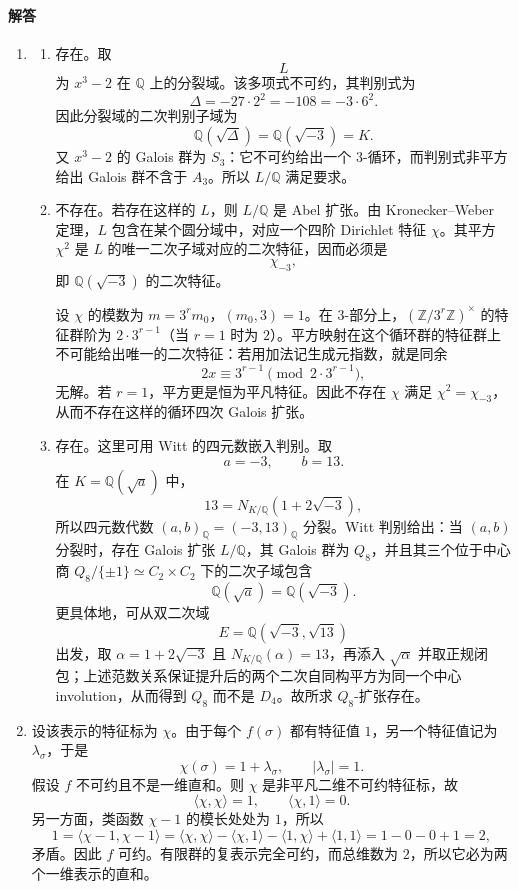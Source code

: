 \documentclass[UTF8,12pt]{ctexart}
\begin{document}
\paragraph{解答}
\begin{enumerate}[label=\textbf{\arabic*.},leftmargin=2.2em]
\item
\begin{enumerate}[label=\textbf{(\alph*)},leftmargin=2.4em]
\item 存在。取
\[
L
\]
为 \(x^3-2\) 在 \(\mathbb Q\) 上的分裂域。该多项式不可约，其判别式为
\[
\Delta=-27\cdot 2^2=-108=-3\cdot6^2.
\]
因此分裂域的二次判别子域为
\[
\mathbb Q(\sqrt{\Delta})=\mathbb Q(\sqrt{-3})=K.
\]
又 \(x^3-2\) 的 Galois 群为 \(S_3\)：它不可约给出一个 3-循环，而判别式非平方给出 Galois 群不含于 \(A_3\)。所以 \(L/\mathbb Q\) 满足要求。

\item 不存在。若存在这样的 \(L\)，则 \(L/\mathbb Q\) 是 Abel 扩张。由 Kronecker--Weber 定理，\(L\) 包含在某个圆分域中，对应一个四阶 Dirichlet 特征 \(\chi\)。其平方 \(\chi^2\) 是 \(L\) 的唯一二次子域对应的二次特征，因而必须是
\[
\chi_{-3},
\]
即 \(\mathbb Q(\sqrt{-3})\) 的二次特征。

设 \(\chi\) 的模数为 \(m=3^r m_0\)，\((m_0,3)=1\)。在 3-部分上，\((\mathbb Z/3^r\mathbb Z)^\times\) 的特征群阶为 \(2\cdot3^{r-1}\)（当 \(r=1\) 时为 \(2\)）。平方映射在这个循环群的特征群上不可能给出唯一的二次特征：若用加法记生成元指数，就是同余
\[
2x\equiv 3^{r-1}\pmod {2\cdot3^{r-1}},
\]
无解。若 \(r=1\)，平方更是恒为平凡特征。因此不存在 \(\chi\) 满足 \(\chi^2=\chi_{-3}\)，从而不存在这样的循环四次 Galois 扩张。

\item 存在。这里可用 Witt 的四元数嵌入判别。取
\[
a=-3,\qquad b=13.
\]
在 \(K=\mathbb Q(\sqrt a)\) 中，
\[
13=N_{K/\mathbb Q}(1+2\sqrt{-3}),
\]
所以四元数代数 \((a,b)_{\mathbb Q}=(-3,13)_{\mathbb Q}\) 分裂。Witt 判别给出：当 \((a,b)\) 分裂时，存在 Galois 扩张 \(L/\mathbb Q\)，其 Galois 群为 \(Q_8\)，并且其三个位于中心商 \(Q_8/\{\pm1\}\simeq C_2\times C_2\) 下的二次子域包含
\[
\mathbb Q(\sqrt a)=\mathbb Q(\sqrt{-3}).
\]
更具体地，可从双二次域
\[
E=\mathbb Q(\sqrt{-3},\sqrt{13})
\]
出发，取 \(\alpha=1+2\sqrt{-3}\) 且 \(N_{K/\mathbb Q}(\alpha)=13\)，再添入 \(\sqrt\alpha\) 并取正规闭包；上述范数关系保证提升后的两个二次自同构平方为同一个中心 involution，从而得到 \(Q_8\) 而不是 \(D_4\)。故所求 \(Q_8\)-扩张存在。
\end{enumerate}

\item 设该表示的特征标为 \(\chi\)。由于每个 \(f(\sigma)\) 都有特征值 \(1\)，另一个特征值记为 \(\lambda_\sigma\)，于是
\[
\chi(\sigma)=1+\lambda_\sigma,\qquad |\lambda_\sigma|=1.
\]
假设 \(f\) 不可约且不是一维直和。则 \(\chi\) 是非平凡二维不可约特征标，故
\[
\langle\chi,\chi\rangle=1,\qquad \langle\chi,1\rangle=0.
\]
另一方面，类函数 \(\chi-1\) 的模长处处为 \(1\)，所以
\[
1=\langle\chi-1,\chi-1\rangle
=\langle\chi,\chi\rangle-\langle\chi,1\rangle-\langle1,\chi\rangle+\langle1,1\rangle
=1-0-0+1=2,
\]
矛盾。因此 \(f\) 可约。有限群的复表示完全可约，而总维数为 \(2\)，所以它必为两个一维表示的直和。


\end{enumerate}
\end{document}
